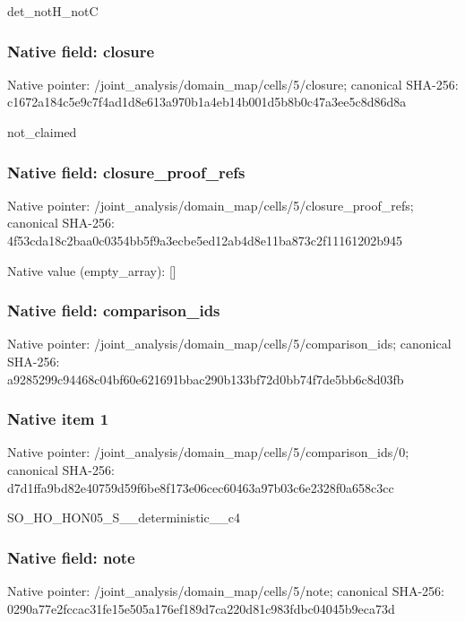 \documentclass[10pt,a4paper]{article}
\begin{document}
\begingroup\raggedright\sloppy det\_\allowbreak{}notH\_\allowbreak{}notC\par\endgroup

\subsubsection{Native field: closure}
Native pointer: /joint\_\allowbreak{}analysis/domain\_\allowbreak{}map/cells/5/closure; canonical SHA-256: c1672a184c5e9c7f4ad1d8e613a970b1a4eb14b001d5b8b0c47a3ee5c8d86d8a

\begingroup\raggedright\sloppy not\_\allowbreak{}claimed\par\endgroup

\subsubsection{Native field: closure\_\allowbreak{}proof\_\allowbreak{}refs}
Native pointer: /joint\_\allowbreak{}analysis/domain\_\allowbreak{}map/cells/5/closure\_\allowbreak{}proof\_\allowbreak{}refs; canonical SHA-256: 4f53cda18c2baa0c0354bb5f9a3ecbe5ed12ab4d8e11ba873c2f11161202b945

Native value (empty\_\allowbreak{}array): []

\subsubsection{Native field: comparison\_\allowbreak{}ids}
Native pointer: /joint\_\allowbreak{}analysis/domain\_\allowbreak{}map/cells/5/comparison\_\allowbreak{}ids; canonical SHA-256: a9285299c94468c04bf60e621691bbac290b133bf72d0bb74f7de5bb6c8d03fb

\subsubsection{Native item 1}
Native pointer: /joint\_\allowbreak{}analysis/domain\_\allowbreak{}map/cells/5/comparison\_\allowbreak{}ids/0; canonical SHA-256: d7d1ffa9bd82e40759d59f6be8f173e06cec60463a97b03c6e2328f0a658c3cc

\begingroup\raggedright\sloppy SO\_\allowbreak{}HO\_\allowbreak{}HON05\_\allowbreak{}S\_\allowbreak{}\_\allowbreak{}deterministic\_\allowbreak{}\_\allowbreak{}c4\par\endgroup

\subsubsection{Native field: note}
Native pointer: /joint\_\allowbreak{}analysis/domain\_\allowbreak{}map/cells/5/note; canonical SHA-256: 0290a77e2fccac31fe15e505a176ef189d7ca220d81c983fdbc04045b9eca73d
\end{document}
